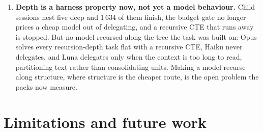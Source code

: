 \documentclass[11pt,a4paper]{article}
\begin{document}
\begin{enumerate}[leftmargin=1.5em,itemsep=3pt]
{  fast enough.} Opus 5.5 saturated five of the first seven packs, so four
  harder ones were built; it solves 198 of 204 runs of those too. The hard
  packs separate models by thirty to a hundred points and modes by a task
  or two, so they say which model to use and, through cost, whether to
  put SQL between it and the context. The imported real datasets (OOLONG,
  Harvey LAB, contract redlining) remain the next step.
\item \textbf{Depth is a harness property now, not yet a model
  behaviour.} Child sessions nest five deep and 1\,634 of them finish, the
  budget gate no longer prices a cheap model out of delegating, and a
  recursive CTE that runs away is stopped. But no model recursed along the
  tree the task was built on: Opus solves every recursion-depth task flat
  with a recursive CTE, Haiku never delegates, and Luna delegates only
  when the context is too long to read, partitioning text rather than
  consolidating units. Making a model recurse along structure, where
  structure is the cheaper route, is the open problem the packs now
  measure.
\end{enumerate}

\section{Limitations and future work}
\label{sec:limits}
\end{document}
